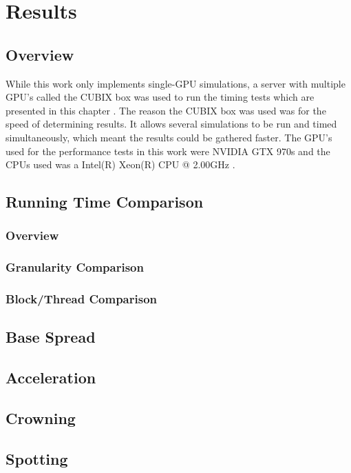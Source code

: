 \chapter{Results}
\label{chapter:results}

\section{Overview}
While this work only implements single-GPU simulations, a server with multiple GPU's called the CUBIX box was used to run the timing tests which are presented in this chapter \cite{cubix}. The reason the CUBIX box was used was for the speed of determining results. It allows several simulations to be run and timed simultaneously, which meant the results could be gathered faster. The GPU's used for the performance tests in this work were NVIDIA GTX 970s and the CPUs used was a Intel(R) Xeon(R) CPU @ 2.00GHz \cite{gtx}\cite{intel}. 

\section{Running Time Comparison}
\subsection{Overview}
\subsection{Granularity Comparison}
\subsection{Block/Thread Comparison}


\section{Base Spread}

\section{Acceleration}

\section{Crowning}

\section{Spotting}